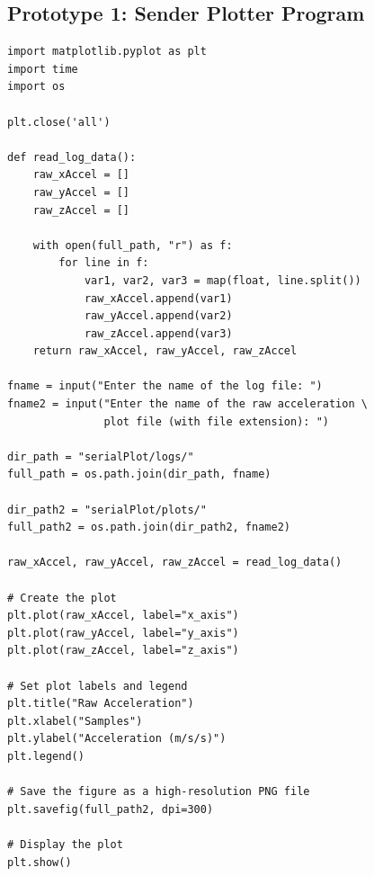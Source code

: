 \subsection{Prototype 1: Sender Plotter Program}
\begin{verbatim}
import matplotlib.pyplot as plt
import time
import os

plt.close('all')

def read_log_data():
    raw_xAccel = []
    raw_yAccel = []
    raw_zAccel = []

    with open(full_path, "r") as f:
        for line in f:
            var1, var2, var3 = map(float, line.split())
            raw_xAccel.append(var1)
            raw_yAccel.append(var2)
            raw_zAccel.append(var3)
    return raw_xAccel, raw_yAccel, raw_zAccel

fname = input("Enter the name of the log file: ")
fname2 = input("Enter the name of the raw acceleration \
               plot file (with file extension): ")

dir_path = "serialPlot/logs/"
full_path = os.path.join(dir_path, fname)

dir_path2 = "serialPlot/plots/"
full_path2 = os.path.join(dir_path2, fname2)

raw_xAccel, raw_yAccel, raw_zAccel = read_log_data()

# Create the plot
plt.plot(raw_xAccel, label="x_axis")
plt.plot(raw_yAccel, label="y_axis")
plt.plot(raw_zAccel, label="z_axis")

# Set plot labels and legend
plt.title("Raw Acceleration")
plt.xlabel("Samples")
plt.ylabel("Acceleration (m/s/s)")
plt.legend()

# Save the figure as a high-resolution PNG file
plt.savefig(full_path2, dpi=300)

# Display the plot
plt.show()
\end{verbatim}
